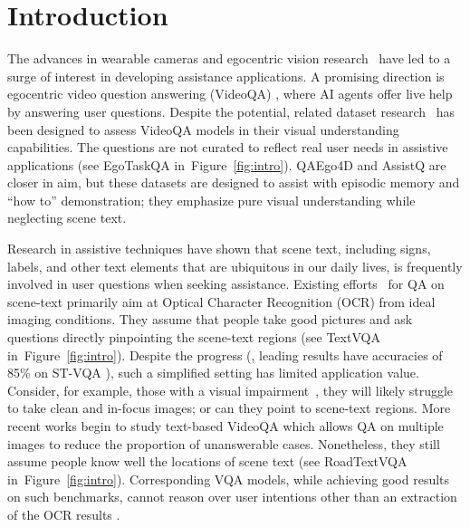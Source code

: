 
\section{Introduction}
\label{sec:intro}
The advances in wearable cameras and egocentric
vision research~\cite{fan2019egovqa, grauman2022ego4d, lin2022egocentric, pramanick2023egovlpv2} have led to a surge of interest in developing assistance applications. A promising direction is egocentric video question answering (VideoQA) \cite{xiao2024videoqa, li2023transformer, yang2024robust, guo2021context, di2024grounded, zhangmulti}, where AI agents offer live help by answering user questions. Despite the potential, related dataset research~\cite{ye2024mm, fan2019egovqa, jia2022egotaskqa, mangalam2023egoschema, cheng2024videgothink} has been designed to assess VideoQA models in their visual understanding capabilities. The questions are not curated to reflect real user needs in assistive applications (see EgoTaskQA in~Figure~\ref{fig:intro}). 
QAEgo4D \cite{Baermann_2022_CVPR} and AssistQ \cite{wong2022assistq} are closer in aim, but these datasets are designed to assist with episodic memory and ``how to'' demonstration; they emphasize pure visual understanding while neglecting scene text.  

Research in assistive techniques \cite{gurari2018vizwiz, zhou2023exploring, singh2019towards, li2022invariant} have shown that scene text, including signs, labels, and other text elements that are ubiquitous in our daily lives, is frequently involved in user questions when seeking assistance. Existing efforts~\cite{singh2019towards, zhou2024scene, biten2019scene} for QA on scene-text primarily aim at Optical Character Recognition (OCR) from ideal imaging conditions.  
They assume that people take good pictures and ask questions directly pinpointing the scene-text regions (see TextVQA~\cite{singh2019towards} in~Figure~\ref{fig:intro}). Despite the progress (\eg, leading results have accuracies of 85\% on ST-VQA \cite{biten2019scene,wang2024qwen2}), such a simplified setting has limited application value. Consider, for example, those with a visual impairment~\cite{gurari2018vizwiz}, they will likely struggle to take clean and in-focus images; or can they point to scene-text regions. More recent works \cite{zhao2022towards,tom2023reading} begin to study text-based VideoQA which allows QA on multiple images to reduce the proportion of unanswerable cases. Nonetheless, they still assume people know well the locations of scene text (see RoadTextVQA~\cite{tom2023reading} in~Figure~\ref{fig:intro}). Corresponding VQA models, while achieving good results on such benchmarks, cannot reason over user intentions other than an extraction of the OCR results \cite{jahagirdar2023understanding}.

